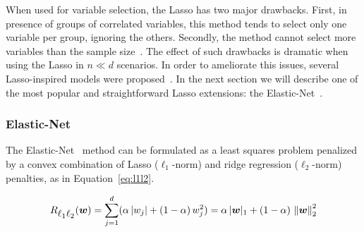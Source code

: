 			When used for variable selection, the Lasso has two major drawbacks. First, in presence of groups of correlated variables, this method tends to select only one variable per group, ignoring the others. Secondly, the method cannot select more variables than the sample size~\cite{waldmann2013evaluation, de2009regularized}.
			The effect of such drawbacks is dramatic when using the Lasso in $n \ll d$ scenarios.
			In order to ameliorate this issues, several Lasso-inspired models were proposed~\cite{meinshausen2010stability, hoggart2008simultaneous, zou2006adaptive}.
			In the next section we will describe one of the most popular and straightforward Lasso extensions: the Elastic-Net~\cite{zou2005regularization}.

			\subsubsection{Elastic-Net}
			The Elastic-Net~\cite{zou2005regularization, de2009elastic} method can be formulated as a least squares problem penalized by a convex combination of Lasso ($\ell_1$-norm) and ridge regression ($\ell_2$-norm) penalties, as in Equation~\eqref{eq:l1l2}.

			\begin{equation}\label{eq:l1l2}
				R_{\mbox{$\ell_1\ell_2$}}(\bm{w}) = \sum_{j=1}^d (\alpha\,|w_j| + (1-\alpha)\,w_j^2) = \alpha\,|\bm{w}|_1 + (1-\alpha)\,\left\lVert\bm{w}\right\rVert_2^2
			\end{equation}

